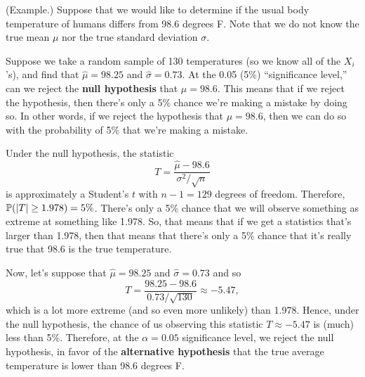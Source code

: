 \documentclass[letterpaper]{article}
\begin{document}
\begin{mdframed}[]
    (Example.) Suppose that we would like to determine if the usual body temperature of humans differs from 98.6 degrees F. Note that we do not know the true mean $\mu$ nor the true standard deviation $\sigma$. 

    \bigskip 

    Suppose we take a random sample of 130 temperatures (so we know all of the $X_i$'s), and find that $\hat{\mu} = 98.25$ and $\hat{\sigma} = 0.73$. At the 0.05 (5\%) ``significance level,'' can we reject the \textbf{null hypothesis} that $\mu = 98.6$. This means that if we reject the hypothesis, then there's only a 5\% chance we're making a mistake by doing so. In other words, if we reject the hypothesis that $\mu = 98.6$, then we can do so with the probability of 5\% that we're making a mistake.
    
    \bigskip 

    Under the null hypothesis, the statistic 
    \[T = \frac{\hat{\mu} - 98.6}{\sigma^2 / \sqrt{n}}\]
    is approximately a Student's $t$ with $n - 1 = 129$ degrees of freedom. Therefore, $\mathbb{P}(|T| \geq 1.978) = 5\%$. There's only a 5\% chance that we will observe something as extreme at something like 1.978. So, that means that if we get a statistics that's larger than 1.978, then that means that there's only a 5\% chance that it's really true that 98.6 is the true temperature. 

    \bigskip 

    Now, let's suppose that $\hat{\mu} = 98.25$ and $\hat{\sigma} = 0.73$ and so 
    \[T = \frac{98.25 - 98.6}{0.73 / \sqrt{130}} \approx -5.47,\]
    which is a lot more extreme (and so even more unlikely) than 1.978. Hence, under the null hypothesis, the chance of us observing this statistic $T \approx -5.47$ is (much) less than 5\%. Therefore, at the $\alpha = 0.05$ significance level, we reject the null hypothesis, in favor of the \textbf{alternative hypothesis} that the true average temperature is lower than 98.6 degrees F. 
\end{mdframed}
\end{document}

